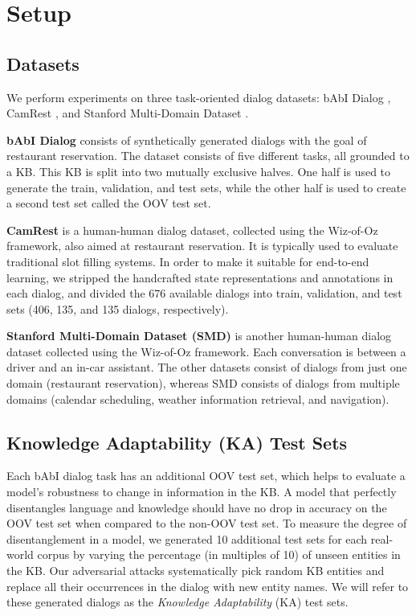 \section{Setup}
\subsection{Datasets}

We perform experiments on three task-oriented dialog datasets: bAbI Dialog \cite{BordesW16}, CamRest \cite{wenEMNLP2016}, and Stanford Multi-Domain Dataset \cite{Ericsigdial}.

\noindent 
\textbf{bAbI Dialog} consists of synthetically generated dialogs with the goal of restaurant reservation. The dataset consists of five different tasks, all grounded to a KB. This KB is split into two mutually exclusive halves. One half is used to generate the train, validation, and test sets, while the other half is used to create a second test set called the OOV test set. 

\noindent 
\textbf{CamRest} is a human-human dialog dataset, collected using the Wiz-of-Oz framework, also aimed at restaurant reservation. It is typically used to evaluate traditional slot filling systems. In order to make it suitable for end-to-end learning, we stripped the handcrafted state representations and annotations in each dialog, and divided the 676 available dialogs into train, validation, and test sets (406, 135, and 135 dialogs, respectively).

\noindent
\textbf{Stanford Multi-Domain Dataset (SMD)} is another human-human dialog dataset collected using the Wiz-of-Oz framework. Each conversation is between a driver and an in-car assistant. The other datasets consist of dialogs from just one domain (restaurant reservation), whereas SMD consists of dialogs from multiple domains (calendar scheduling, weather information retrieval, and navigation).

\subsection{Knowledge Adaptability (KA) Test Sets}

Each bAbI dialog task has an additional OOV test set, which helps to evaluate a model's robustness to change in information in the KB. A model that perfectly disentangles language and knowledge should have no drop in accuracy on the OOV test set when compared to the non-OOV test set. To measure the degree of disentanglement in a model, we generated 10 additional test sets for each real-world corpus by varying the percentage (in multiples of 10) of unseen entities in the KB. Our adversarial attacks systematically pick random KB entities and replace all their occurrences in the dialog with new entity names. We will refer to these generated dialogs as the \emph{Knowledge Adaptability} (KA) test sets.

